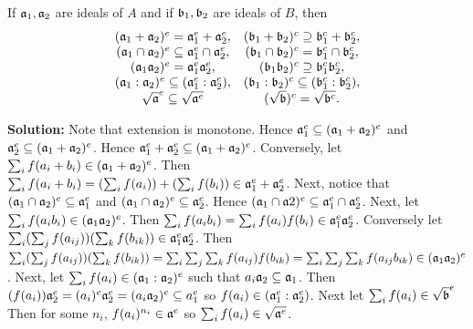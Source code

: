 \documentclass{article}
\begin{document}
\begin{exercise}
    If \(\mathfrak{a}_1, \mathfrak{a}_2\) are ideals of \(A\) and if \(\mathfrak{b}_1, \mathfrak{b}_2\) are ideals of \(B\), then
    \[
        \begin{array}{c c}
            (\mathfrak{a}_1 + \mathfrak{a}_2)^e = \mathfrak{a}_1^e + \mathfrak{a}_2^e, &
            (\mathfrak{b}_1 + \mathfrak{b}_2)^c \supseteq \mathfrak{b}_1^c + \mathfrak{b}_2^c, \\
            (\mathfrak{a}_1 \cap \mathfrak{a}_2)^e \subseteq \mathfrak{a}_1^e \cap \mathfrak{a}_2^e, &
            (\mathfrak{b}_1 \cap \mathfrak{b}_2)^c = \mathfrak{b}_1^c \cap \mathfrak{b}_2^c, \\
            (\mathfrak{a}_1 \mathfrak{a}_2)^e = \mathfrak{a}_1^e \mathfrak{a}_2^e, &
            (\mathfrak{b}_1 \mathfrak{b}_2)^c \supseteq \mathfrak{b}_1^c \mathfrak{b}_2^c, \\
            (\mathfrak{a}_1 : \mathfrak{a}_2)^e \subseteq (\mathfrak{a}_1^e : \mathfrak{a}_2^e), &
            (\mathfrak{b}_1 : \mathfrak{b}_2)^c \subseteq (\mathfrak{b}_1^c : \mathfrak{b}_2^c), \\
            \sqrt{\mathfrak{a}}^e \subseteq \sqrt{\mathfrak{a}^e} &
            (\sqrt{\mathfrak{b}})^c = \sqrt{\mathfrak{b}^c}.
        \end{array}
    \]
\end{exercise}

\noindent\textbf{Solution:}
Note that extension is monotone.
Hence \(\mathfrak{a}_1^e \subseteq (\mathfrak{a}_1 + \mathfrak{a}_2)^e\) and \(\mathfrak{a}_2^e \subseteq (\mathfrak{a}_1 + \mathfrak{a}_2)^e\).
Hence \(\mathfrak{a}_1^e + \mathfrak{a}_2^e \subseteq (\mathfrak{a}_1 + \mathfrak{a}_2)^e\).
Conversely, let \(\sum_i f(a_i + b_i) \in (\mathfrak{a}_1 + \mathfrak{a}_2)^e\).
Then \(\sum_i f(a_i + b_i) = (\sum_i f(a_i)) + (\sum_i f(b_i)) \in \mathfrak{a}_1^e + \mathfrak{a}_2^e\).
Next, notice that \((\mathfrak{a}_1 \cap \mathfrak{a}_2)^e \subseteq \mathfrak{a}_1^e\) and \((\mathfrak{a}_1 \cap \mathfrak{a}_2)^e \subseteq \mathfrak{a}_2^e\).
Hence \((\mathfrak{a}_1 \cap \mathfrak{a}2)^e \subseteq \mathfrak{a}_1^e \cap \mathfrak{a}_2^e\).
Next, let \(\sum_i f(a_i b_i) \in (\mathfrak{a}_1 \mathfrak{a}_2)^e\).
Then \(\sum_i f(a_i b_i) = \sum_i f(a_i) f(b_i) \in \mathfrak{a}_1^e \mathfrak{a}_2^e\).
Conversely let \(\sum_i (\sum_j f(a_{ij})) (\sum_k f(b_{ik})) \in \mathfrak{a}_1^e \mathfrak{a}_2^e\).
Then \(\sum_i (\sum_j f(a_{ij})) (\sum_k f(b_{ik})) = \sum_i \sum_j \sum_k f(a_{ij}) f(b_{ik}) = \sum_i \sum_j \sum_k f(a_{ij}b_{ik}) \in (\mathfrak{a}_1 \mathfrak{a}_2)^e\).
Next, let \(\sum_i f(a_i) \in (\mathfrak{a}_1 : \mathfrak{a}_2)^e\) such that \(a_i \mathfrak{a}_2 \subseteq \mathfrak{a}_1\).
Then \((f(a_i))\mathfrak{a}_2^e = (a_i)^e\mathfrak{a}_2^e = (a_i \mathfrak{a}_2)^e \subseteq a_1^e\) so \(f(a_i) \in (\mathfrak{a}_1^e : \mathfrak{a}_2^e)\).
Next let \(\sum_i f(a_i) \in \sqrt{\mathfrak{b}}^e\)
Then for some \(n_i\), \(f(a_i)^{n_i} \in \mathfrak{a}^e\) so \(\sum_i f(a_i) \in \sqrt{\mathfrak{a}^e}\).
\end{document}
